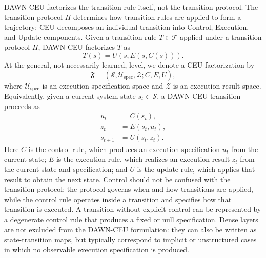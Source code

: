 \documentclass{article}
\begin{document}
DAWN-CEU factorizes the transition rule itself, not the transition protocol. The transition protocol $\Pi$ determines how transition rules are applied to form a trajectory; CEU decomposes an individual transition into Control, Execution, and Update components. Given a transition rule $T\in\mathcal{T}$ applied under a transition protocol $\Pi$, DAWN-CEU factorizes $T$ as
\begin{equation}
    T(s)=U(s,E(s,C(s))).
    \label{eq:intro_ceu_factorized_transition}
\end{equation}
At the general, not necessarily learned, level, we denote a CEU factorization by
\begin{equation}
    \mathfrak{F}=(\mathcal{S},\mathcal{U}_{\mathrm{spec}},\mathcal{Z};C,E,U),
    \label{eq:intro_ceu_formulation}
\end{equation}
where $\mathcal{U}_{\mathrm{spec}}$ is an execution-specification space and $\mathcal{Z}$ is an execution-result space. Equivalently, given a current system state $s_t\in\mathcal{S}$, a DAWN-CEU transition proceeds as
\begin{align}
    u_t &= C(s_t), \label{eq:intro_general_control}\\
    z_t &= E(s_t,u_t), \label{eq:intro_general_exec}\\
    s_{t+1} &= U(s_t,z_t) .
    \label{eq:intro_general_transition}
\end{align}
Here $C$ is the control rule, which produces an execution specification $u_t$ from the current state; $E$ is the execution rule, which realizes an execution result $z_t$ from the current state and specification; and $U$ is the update rule, which applies that result to obtain the next state. Control should not be confused with the transition protocol: the protocol governs when and how transitions are applied, while the control rule operates inside a transition and specifies how that transition is executed. A transition without explicit control can be represented by a degenerate control rule that produces a fixed or null specification. Dense layers are not excluded from the DAWN-CEU formulation: they can also be written as state-transition maps, but typically correspond to implicit or unstructured cases in which no observable execution specification is produced.
\end{document}
